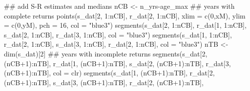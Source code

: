 \documentclass[11pt,]{article}
\newenvironment{Shaded}{}{}
\newcommand{\CommentTok}[1]{\textcolor[rgb]{0.00,0.50,0.00}{#1}}
\newcommand{\DataTypeTok}[1]{#1}
\newcommand{\DecValTok}[1]{#1}
\newcommand{\KeywordTok}[1]{\textcolor[rgb]{0.00,0.00,1.00}{#1}}
\newcommand{\NormalTok}[1]{#1}
\newcommand{\OperatorTok}[1]{#1}
\newcommand{\StringTok}[1]{\textcolor[rgb]{0.00,0.50,0.50}{#1}}
\begin{document}
\begin{Shaded}
\begin{Highlighting}[]
\CommentTok{## add S-R estimates and medians}
\NormalTok{nCB <-}\StringTok{ }\NormalTok{n_yrs}\OperatorTok{-}\NormalTok{age_max}
\CommentTok{## years with complete returns}
\KeywordTok{points}\NormalTok{(s_dat[}\DecValTok{2}\NormalTok{, }\DecValTok{1}\OperatorTok{:}\NormalTok{nCB], r_dat[}\DecValTok{2}\NormalTok{, }\DecValTok{1}\OperatorTok{:}\NormalTok{nCB],}
       \DataTypeTok{xlim =} \KeywordTok{c}\NormalTok{(}\DecValTok{0}\NormalTok{,xM), }\DataTypeTok{ylim =} \KeywordTok{c}\NormalTok{(}\DecValTok{0}\NormalTok{,yM),}
       \DataTypeTok{pch =} \DecValTok{16}\NormalTok{, }\DataTypeTok{col =} \StringTok{"blue3"}\NormalTok{)}
\KeywordTok{segments}\NormalTok{(s_dat[}\DecValTok{2}\NormalTok{, }\DecValTok{1}\OperatorTok{:}\NormalTok{nCB], r_dat[}\DecValTok{1}\NormalTok{, }\DecValTok{1}\OperatorTok{:}\NormalTok{nCB],}
\NormalTok{         s_dat[}\DecValTok{2}\NormalTok{, }\DecValTok{1}\OperatorTok{:}\NormalTok{nCB], r_dat[}\DecValTok{3}\NormalTok{, }\DecValTok{1}\OperatorTok{:}\NormalTok{nCB],}
         \DataTypeTok{col =} \StringTok{"blue3"}\NormalTok{)}
\KeywordTok{segments}\NormalTok{(s_dat[}\DecValTok{1}\NormalTok{, }\DecValTok{1}\OperatorTok{:}\NormalTok{nCB], r_dat[}\DecValTok{2}\NormalTok{, }\DecValTok{1}\OperatorTok{:}\NormalTok{nCB],}
\NormalTok{         s_dat[}\DecValTok{3}\NormalTok{, }\DecValTok{1}\OperatorTok{:}\NormalTok{nCB], r_dat[}\DecValTok{2}\NormalTok{, }\DecValTok{1}\OperatorTok{:}\NormalTok{nCB],}
         \DataTypeTok{col =} \StringTok{"blue3"}\NormalTok{)}
\NormalTok{nTB <-}\StringTok{ }\KeywordTok{dim}\NormalTok{(s_dat)[}\DecValTok{2}\NormalTok{]}
\CommentTok{## years with incomplete returns}
\KeywordTok{segments}\NormalTok{(s_dat[}\DecValTok{2}\NormalTok{, (nCB}\OperatorTok{+}\DecValTok{1}\NormalTok{)}\OperatorTok{:}\NormalTok{nTB], r_dat[}\DecValTok{1}\NormalTok{, (nCB}\OperatorTok{+}\DecValTok{1}\NormalTok{)}\OperatorTok{:}\NormalTok{nTB],}
\NormalTok{         s_dat[}\DecValTok{2}\NormalTok{, (nCB}\OperatorTok{+}\DecValTok{1}\NormalTok{)}\OperatorTok{:}\NormalTok{nTB], r_dat[}\DecValTok{3}\NormalTok{, (nCB}\OperatorTok{+}\DecValTok{1}\NormalTok{)}\OperatorTok{:}\NormalTok{nTB],}
         \DataTypeTok{col =}\NormalTok{ clr)}
\KeywordTok{segments}\NormalTok{(s_dat[}\DecValTok{1}\NormalTok{, (nCB}\OperatorTok{+}\DecValTok{1}\NormalTok{)}\OperatorTok{:}\NormalTok{nTB], r_dat[}\DecValTok{2}\NormalTok{, (nCB}\OperatorTok{+}\DecValTok{1}\NormalTok{)}\OperatorTok{:}\NormalTok{nTB],}
\NormalTok{         s_dat[}\DecValTok{3}\NormalTok{, (nCB}\OperatorTok{+}\DecValTok{1}\NormalTok{)}\OperatorTok{:}\NormalTok{nTB], r_dat[}\DecValTok{2}\NormalTok{, (nCB}\OperatorTok{+}\DecValTok{1}\NormalTok{)}\OperatorTok{:}\NormalTok{nTB],}

\end{Highlighting}
\end{Shaded}
\end{document}
